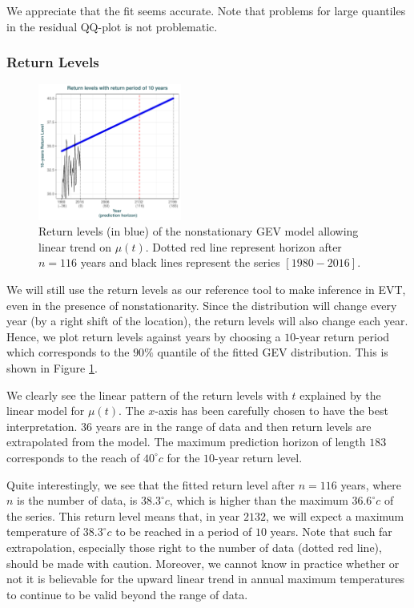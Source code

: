 We appreciate that the fit seems accurate. Note that problems for large quantiles in the residual QQ-plot is not problematic. 



\subsubsection*{Return Levels}

\begin{figure}
	\centering
	\includegraphics[width=0.42\textwidth]{rl_nsta.pdf} %
	\caption{Return levels (in blue) of the nonstationary GEV model allowing linear trend on $\mu(t)$. Dotted red line represent horizon after $n=116$ years and black lines represent the series $[1980-2016]$.  }
	\label{fig:rl_nsta}
	
\end{figure}


We will still use the return levels as our reference tool to make inference in EVT, even in the presence of nonstationarity. Since the distribution will change every year (by a right shift of the location), the return levels will also change each year. Hence, we plot return levels against years by choosing a $10$-year return period which corresponds to the $90\%$ quantile of the fitted GEV distribution. This is shown in Figure \ref{fig:rl_nsta}.

We clearly see the linear pattern of the return levels with $t$ explained by the linear model for $\mu(t)$. The $x$-axis has been carefully chosen to have the best interpretation. $36$ years are in the range of data and then return levels are extrapolated from the model. The maximum prediction horizon of length $183$ corresponds to the reach of $40^{\circ}c$ for the $10$-year return level. 

Quite interestingly, we see that the fitted return level after $n=116$ years, where $n$ is the number of data, is $38.3^{\circ}c$, which is higher than the maximum $36.6^{\circ}c$ of the series. 
This return level means that, in year $2132$, we will expect a maximum temperature of $38.3^{\circ}c$ to be reached in a period of $10$ years. Note that such far extrapolation, especially those right to the number of data (dotted red line), should be made with caution.
Moreover, we cannot know in practice whether or not it is believable
for the upward linear trend in annual maximum temperatures to continue to be valid beyond the range of data.

